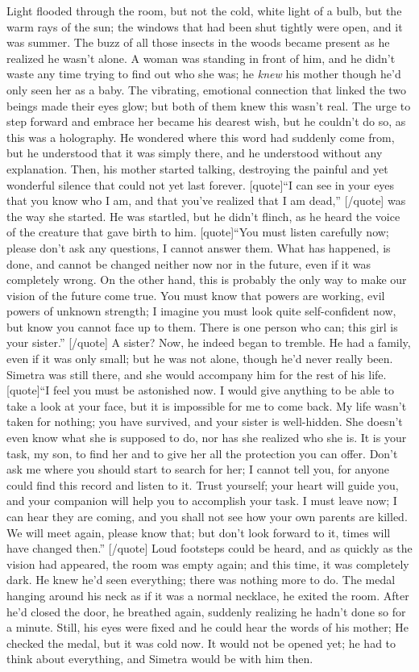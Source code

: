 Light flooded through the room, but not the cold, white light of a bulb, but the warm rays of the sun; the windows that had been shut tightly were open, and it was summer. The buzz of all those insects in the woods became present as he realized he wasn't alone. 
A woman was standing in front of him, and he didn't waste any time trying to find out who she was; he \emph{knew} his mother though he'd only seen her as a baby. The vibrating, emotional connection that linked the two beings made their eyes glow; but both of them knew this wasn't real. The urge to step forward and embrace her became his dearest wish, but he couldn't do so, as this was a holography. He wondered where this word had suddenly come from, but he understood that it was simply there, and he understood without any explanation. 
Then, his mother started talking, destroying the painful and yet wonderful silence that could not yet last forever. 
[quote]\enquote{I can see in your eyes that you know who I am, and that you've realized that I am dead,}
[/quote]
was the way she started. He was startled, but he didn't flinch, as he heard the voice of the creature that gave birth to him. 
[quote]\enquote{You must listen carefully now; please don't ask any questions, I cannot answer them. What has happened, is done, and cannot be changed neither now nor in the future, even if it was completely wrong. On the other hand, this is probably the only way to make our vision of the future come true. You must know that powers are working, evil powers of unknown strength; I imagine you must look quite self-confident now, but know you cannot face up to them. There is one person who can; this girl is your sister.}
[/quote]
A sister? Now, he indeed began to tremble. He had a family, even if it was only small; but he was not alone, though he'd never really been. Simetra was still there, and she would accompany him for the rest of his life. 
[quote]\enquote{I feel you must be astonished now. I would give anything to be able to take a look at your face, but it is impossible for me to come back. My life wasn't taken for nothing; you have survived, and your sister is well-hidden. She doesn't even know what she is supposed to do, nor has she realized who she is. It is your task, my son, to find her and to give her all the protection you can offer. Don't ask me where you should start to search for her; I cannot tell you, for anyone could find this record and listen to it. Trust yourself; your heart will guide you, and your companion will help you to accomplish your task. I must leave now; I can hear they are coming, and you shall not see how your own parents are killed. We will meet again, please know that; but don't look forward to it, times will have changed then.}
[/quote]
Loud footsteps could be heard, and as quickly as the vision had appeared, the room was empty again; and this time, it was completely dark. He knew he'd seen everything; there was nothing more to do. The medal hanging around his neck as if it was a normal necklace, he exited the room. After he'd closed the door, he breathed again, suddenly realizing he hadn't done so for a minute. Still, his eyes were fixed and he could hear the words of his mother; He checked the medal, but it was cold now. It would not be opened yet; he had to think about everything, and Simetra would be with him then.

